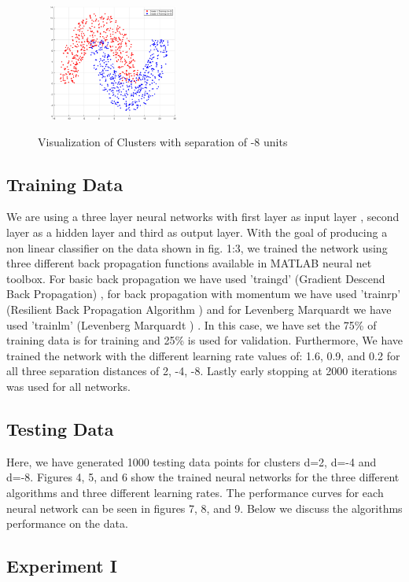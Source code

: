 \documentclass[conference]{IEEEtran}
\begin{document}
\begin{figure}[h!]
\centering
{\includegraphics[width=2in,height=1.5in,clip,keepaspectratio]{ClustersDn8.eps} }\\
\caption{ Visualization of Clusters with separation of -8 units}
\end{figure}
\subsection{Training Data}
We are using a three layer neural networks with first layer as input layer , second layer as a hidden layer and third as output layer. With the goal of producing a non linear classifier on the data shown in fig. 1:3, we trained the network using three different back propagation functions available in MATLAB neural net toolbox. For basic back propagation we have used 'traingd' (Gradient Descend Back Propagation)\cite{gd} \cite{mgd}, for back propagation with momentum we have used 'trainrp' (Resilient Back Propagation Algorithm )\cite{gdm} \cite{mgdm}and for Levenberg Marquardt we have used 'trainlm' (Levenberg Marquardt )\cite{lm} \cite{mlm}. In this case, we have set the 75\% of training data is for training and 25\% is used for validation. Furthermore, We have trained the network with the different learning rate values of: 1.6, 0.9, and 0.2  for all three separation distances of 2, -4, -8. Lastly early stopping at 2000 iterations was used for all networks.

\subsection{Testing Data}
 Here, we have generated 1000 testing data points for clusters d=2, d=-4 and d=-8. Figures 4, 5, and 6 show the trained neural networks for the three different algorithms and three different learning rates. The performance curves for each neural network can be seen in figures 7, 8, and 9. Below we discuss the algorithms performance on the data.
\subsection{Experiment I}
\end{document}
